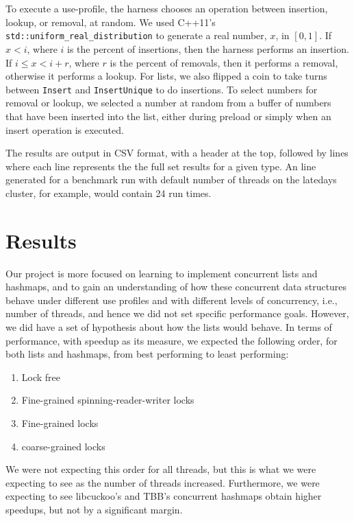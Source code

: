 \documentclass[11pt]{article}
\begin{document}
To execute a use-profile, the harness chooses an operation between insertion,
lookup, or removal, at random. We used C++11's {\tt
std::uniform\_real\_distribution} to generate a real number, $x$, in $[0,1]$. If
$x < i$, where $i$ is the percent of insertions, then the harness performs an
insertion. If $i \le x < i + r$, where $r$ is the percent of removals, then it
performs a removal, otherwise it performs a lookup. For lists, we also flipped a
coin to take turns between {\tt Insert} and {\tt InsertUnique} to do insertions.
To select numbers for removal or lookup, we selected a number at random from a
buffer of numbers that have been inserted into the list, either during preload
or simply when an insert operation is executed.

The results are output in CSV format, with a header at the top, followed by
lines where each line represents the the full set results for a given type. An
line generated for a benchmark run with default number of threads on the
latedays cluster, for example, would contain 24 run times.

\section{Results}
Our project is more focused on learning to implement concurrent lists and
hashmaps, and to gain an understanding of how these concurrent data structures
behave under different use profiles and with different levels of concurrency,
i.e., number of threads, and hence we did not set specific performance goals.
However, we did have a set of hypothesis about how the lists would behave. In
terms of performance, with speedup as its measure, we expected the following
order, for both lists and hashmaps, from best performing to least performing:

\begin{enumerate}
\item Lock free
\item Fine-grained spinning-reader-writer locks
\item Fine-grained locks
\item coarse-grained locks
\end{enumerate}

We were not expecting this order for all threads, but this is what we were
expecting to see as the number of threads increased. Furthermore, we were
expecting to see libcuckoo's and TBB's concurrent hashmaps obtain higher
speedups, but not by a significant margin.
\end{document}
